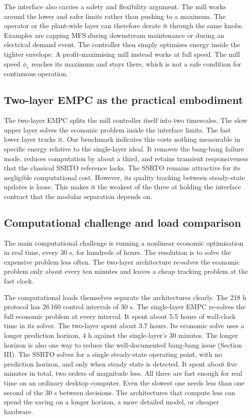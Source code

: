 \documentclass[conference]{IEEEtran}
\begin{document}
The interface also carries a safety and flexibility argument. The mill
works around the lower and safer limits rather than pushing to a
maximum. The operator or the plant-wide layer can therefore derate it
through the same knobs. Examples are capping MFS during downstream
maintenance or during an electrical demand event.
The controller then simply optimises energy inside the tighter envelope.
A profit-maximising mill instead works at full speed. The mill speed
$\phi_c$ reaches its maximum and stays there, which is not a safe
condition for continuous operation.

\subsection{Two-layer EMPC as the practical embodiment}

The two-layer EMPC splits the mill controller itself into two
timescales. The slow upper layer solves the economic problem inside the
interface limits. The fast lower layer tracks it. Our benchmark indicates
this costs nothing measurable in specific energy relative to the
single-layer ideal. It removes the bang-bang failure mode, reduces
computation by about a third, and retains transient responsiveness that
the classical SSRTO reference lacks. The SSRTO remains attractive for its
negligible computational cost. However, its quality tracking between
steady-state updates is loose. This makes it the weakest of the three
at holding the interface contract that the modular separation depends
on.

\subsection{Computational challenge and load comparison}

The main computational challenge is running a nonlinear economic
optimisation in real time, every 30 s, for hundreds of hours. The
resolution is to solve the expensive problem less often. The two-layer
architecture re-solves the economic problem only about every ten
minutes and leaves a cheap tracking problem at the fast clock.

The computational loads themselves separate the architectures clearly.
The 218 h protocol has 26\,160 control intervals of 30 s. The
single-layer EMPC re-solves the full economic problem at every
interval. It spent about 5.5 hours of wall-clock time in its solver.
The two-layer spent about 3.7 hours. Its economic solve uses a longer
prediction horizon, 4 h against the
single-layer's 30 minutes. The longer horizon is also one way to
reduce the well-documented bang-bang issue
\cite{thivierge2023,ellis2017} (Section III). The SSRTO solves for a
single steady-state operating point, with no prediction horizon, and
only when steady state is detected. It
spent about five minutes in total, two orders of magnitude less. All three are fast enough for real time on
an ordinary desktop computer. Even the slowest one needs less than one
second of the 30 s between decisions. The architectures that compute
less can spend the saving on a longer horizon, a more detailed model,
or cheaper hardware.
\end{document}
